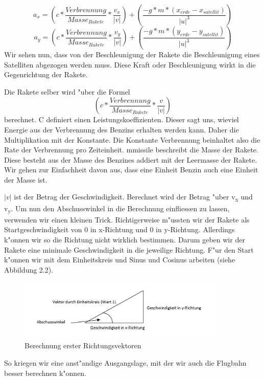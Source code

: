 \documentclass[11pt]{report}
\begin{document}
\begin{equation}
a_{x} = (c * \frac{Verbrennung}{Masse_{Rakete}} * \frac{v_{x}}{|v|})  +  (\frac{-g * m * (x_{erde} - x_{satellit})}{|u|^3})
\end{equation}
\begin{equation}
a_{y} = (c * \frac{Verbrennung}{Masse_{Rakete}} * \frac{v_{y}}{|v|})  +  (\frac{-g * m * (y_{erde} - y_{satellit})}{|u|^3})
\end{equation}
Wir sehen nun, dass von der Beschleunigung der Rakete die Beschleunigung eines Satelliten abgezogen werden muss. Diese Kraft oder Beschleunigung wirkt in die Gegenrichtung der Rakete.
\linebreak

Die Rakete selber wird "uber die Formel
\begin{equation}
(c * \frac{Verbrennung}{Masse_{Rakete}} * \frac{v}{|v|})
\end{equation}
berechnet. C definiert einen Leistungskoeffizienten. Dieser sagt uns, wieviel Energie aus der Verbrennung des Benzins erhalten werden kann. Daher die Multiplikation mit der Konstante. Die Konstante Verbrennung beinhaltet also die Rate der Verbrennung pro Zeiteinheit.
mmissile beschreibt die Masse der Rakete. Diese besteht aus der Masse des Benzines addiert mit der Leermasse der Rakete. Wir gehen zur Einfachheit davon aus, dass eine Einheit Benzin auch eine Einheit der Masse ist.
\linebreak

$|v|$ ist der Betrag der Geschwindigkeit. Berechnet wird der Betrag "uber v\textsubscript{x} und v\textsubscript{y}.
Um nun den Abschusswinkel in die Berechnung einfliessen zu lassen, verwenden wir einen kleinen Trick. Richtigerweise m"ussten wir der Rakete als  Startgeschwindigkeit von 0 in x-Richtung und 0 in y-Richtung. Allerdings k"onnen wir so die Richtung nicht wirklich bestimmen. Darum geben wir der Rakete eine minimale Geschwindigkeit in die jeweilige Richtung.
F"ur den Start k"onnen wir mit dem Einheitskreis und Sinus und Cosinus arbeiten (siehe Abbildung 2.2).
\linebreak
\begin{figure}[H]
\begin{center}
\includegraphics[width=10cm]{Winkel.jpg}
\caption{Berechnung erster Richtungsvektoren}
\end{center}
\label{fig2}
\end{figure} 
So kriegen wir eine anst"andige Ausgangslage, mit der wir auch die Flugbahn besser berechnen k"onnen.
\linebreak
\end{document}
